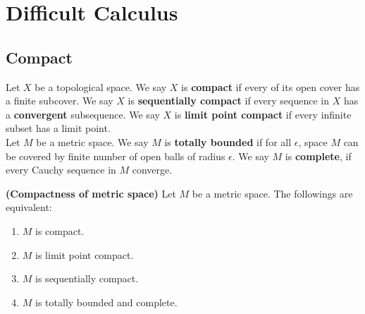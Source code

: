 \documentclass{report}
\begin{document}
\chapter{Difficult Calculus}
\section{Compact}
Let $X$ be a topological space. We say $X$ is \textbf{compact} if every of its open cover has a finite subcover. We say $X$ is \textbf{sequentially compact} if every sequence in $X$ has a \textbf{convergent} subsequence. We say $X$ is \textbf{limit point compact} if every infinite subset has a limit point.\\


Let $M$ be a metric space.  We say $M$ is \textbf{totally bounded} if for all $\epsilon $, space $M$ can be covered by finite number of open balls of radius $\epsilon $. We say $M$ is  \textbf{complete}, if every Cauchy sequence in $M$ converge.  
\begin{equiv_def}
\label{Com}
\textbf{(Compactness of metric space)} Let $M$ be a metric space. The followings are equivalent: 
\begin{enumerate}[label=(\roman*)]
  \item $M$ is compact. 
  \item $M$ is limit point compact. 
  \item $M$ is sequentially compact. 
  \item $M$ is totally bounded and complete. 
\end{enumerate}
\end{equiv_def}
\end{document}
